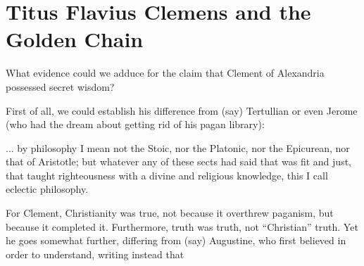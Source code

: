 \section{Titus Flavius Clemens and the Golden Chain}

What evidence could we adduce for the claim that Clement of Alexandria possessed secret wisdom?

First of all, we could establish his difference from (say) Tertullian or even Jerome (who had the dream about getting rid of his pagan library):

\begin{quotex}
... by philosophy I mean not the Stoic, nor the Platonic, nor the Epicurean, nor that of Aristotle; but whatever any of these sects had said that was fit and just, that taught righteousness with a divine and religious knowledge, this I call eclectic philosophy.
\end{quotex}


For Clement, Christianity was true, not because it overthrew paganism, but because it completed it. Furthermore, truth was truth, not ``Christian'' truth. Yet he goes somewhat further, differing from (say) Augustine, who first believed in order to understand, writing instead that

